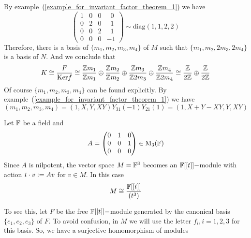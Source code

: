         By example~(\ref{example_for_invariant_factor_theorem_1}) we have
        \begin{equation}
            \begin{pmatrix}
                1 & 0 & 0 & \;\;0 \\
                0 & 2 & 0 & \;\;1\\
                0 & 0 & 2 & \;\;1\\
                0 & 0 & 0 & -1
            \end{pmatrix}\sim\text{diag}(1,1,2,2)
        \end{equation}
        Therefore, there is a basis of $\{m_1,m_2,m_3,m_4\}$ of $M$ such that $\{m_1,m_2,2m_3,2m_4\}$ is a basis of $N$. And we conclude that
        \begin{equation}
            K\cong\frac{F}{\text{Ker}f}\cong \frac{\mathbb{Z}m_1}{\mathbb{Z}m_1}\oplus\frac{\mathbb{Z}m_2}{\mathbb{Z}m_2}\oplus\frac{\mathbb{Z}m_3}{\mathbb{Z}2m_3}\oplus\frac{\mathbb{Z}m_4}{\mathbb{Z}2m_4}\cong\frac{\mathbb{Z}}{2\mathbb{Z}}\oplus\frac{\mathbb{Z}}{2\mathbb{Z}}
        \end{equation}
Of course $\{m_1,m_2,m_3,m_4\}$ can be found explicitly. By example~(\ref{example_for_invariant_factor_theorem_1}) we have 
\begin{equation}
    (m_1,m_2,m_3,m_4)=(1,X,Y,XY)Y_{31}(-1)Y_{21}(1)=(1,X+Y-XY,Y, XY)
\end{equation}
\begin{dang}
    \begin{example}\label{nilpotent_matrix_example}
        Let $\mathbb{F}$ be a field and 
        \begin{equation}
            A = \begin{pmatrix}
                0&1&0\\
                0&0&1\\
                0&0&0
            \end{pmatrix}\in\text{M}_3(\mathbb{F})
        \end{equation}
        Since $A$ is nilpotent, the vector space $M=\mathbb{F}^3$ becomes an $\mathbb{F}[[t]]-$module with action $t\cdot v\bydef Av$ for $v\in M$. In this case
        \begin{equation}
            M \cong\frac{\mathbb{F}[[t]]}{(t^3)}
        \end{equation}
    \end{example}
\end{dang}
To see this, let $F$ be the free $\mathbb{F}[[t]]-$module generated by the canonical basis $\{e_1,e_2,e_3\}$ of $F$. To avoid confusion, in $M$ we will use the letter $f_i, i=1,2,3$ for this basis. So, we have a surjective homomorphism of modules
